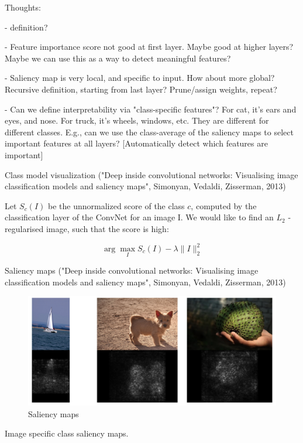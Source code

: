 \documentclass[english]{article}
\begin{document}
\item Thoughts: 

- definition?

- Feature importance score not good at first layer. Maybe good at higher layers? Maybe we can use this as a way to detect meaningful features?

- Saliency map is very local, and specific to input. How about more global? Recursive definition, starting from last layer? Prune/assign weights, repeat?

- Can we define interpretability via "class-specific features"? For cat, it's ears and eyes, and nose. For truck, it's wheels, windows, etc. They are different for different classes. E.g., can we use the class-average of the saliency maps to select important features at all layers? [Automatically detect which features are important]

\item Class model visualization ("Deep inside convolutional networks: Visualising image classification models and saliency maps", Simonyan, Vedaldi, Zisserman, 2013)

Let $S_c(I)$ be the unnormalized score of the class $c$, computed by the classification layer of the ConvNet for an image I. We would like to find an $L_2$  - regularised image, such that the score is
high:

$$\arg\max_I
S_c(I) - \lambda \|I\|_2^2 
$$

\item  Saliency maps ("Deep inside convolutional networks: Visualising image classification models and saliency maps", Simonyan, Vedaldi, Zisserman, 2013)


\begin{figure}
  \centering
  \includegraphics[width=\textwidth]{saliency.png}
  \caption{Saliency maps}
  \label{saliency}
\end{figure}


Image specific class saliency maps. 
\end{document}
